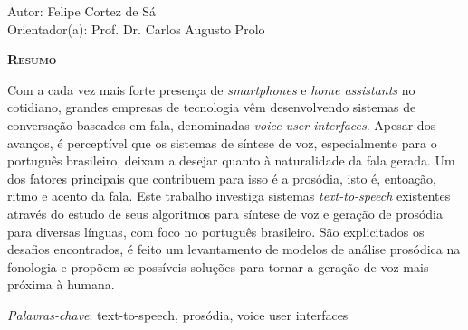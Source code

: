 \begin{center}
	{\Large{\textbf{\tccTitle}}}
\end{center}

\vspace{1cm}

\begin{flushright}
	Autor: Felipe Cortez de Sá \\
	Orientador(a): Prof. Dr. Carlos Augusto Prolo
\end{flushright}

\vspace{1cm}

\begin{center}
	\Large{\textsc{\textbf{Resumo}}}
\end{center}

\noindent Com a cada vez mais forte presença de \emph{smartphones} e \emph{home
assistants} no cotidiano, grandes empresas de tecnologia vêm desenvolvendo
sistemas de conversação baseados em fala, denominadas \emph{voice user interfaces}.
Apesar dos avanços, é perceptível que os sistemas de síntese de voz,
especialmente para o português brasileiro, deixam a desejar quanto à
naturalidade da fala gerada. Um dos fatores principais que contribuem para isso
é a prosódia, isto é, entoação, ritmo e acento da fala. Este trabalho investiga
sistemas \emph{text-to-speech} existentes através do estudo de seus algoritmos para
síntese de voz e geração de prosódia para diversas línguas, com foco no
português brasileiro. São explicitados os desafios encontrados, é feito um
levantamento de modelos de análise prosódica na fonologia e propõem-se
possíveis soluções para tornar a geração de voz mais próxima à humana.

\noindent\textit{Palavras-chave}: text-to-speech, prosódia, voice user interfaces
